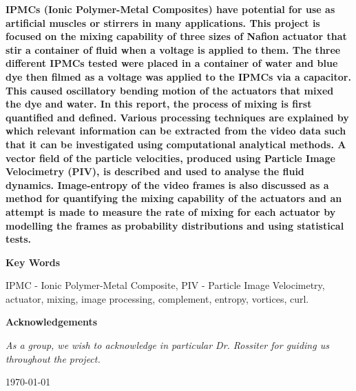 \begin{titlepage}
\begin{minipage}{0.9\textwidth}
\textbf{IPMCs (Ionic Polymer-Metal Composites) have potential for use as artificial muscles or stirrers in many applications. This project is focused on the mixing capability of three sizes of Nafion actuator that stir a container of fluid when a voltage is applied to them. The three different IPMCs tested were placed in a container of water and blue dye then filmed as a voltage was applied to the IPMCs via a capacitor. This caused oscillatory bending motion of the actuators that mixed the dye and water. In this report, the process of mixing is first quantified and defined. Various processing techniques are explained by which relevant information can be extracted from the video data such that it can be investigated using computational analytical methods. A vector field of the particle velocities, produced using Particle Image Velocimetry (PIV), is described and used to analyse the fluid dynamics. Image-entropy of the video frames is also discussed as a method for quantifying the mixing capability of the actuators and an attempt is made to measure the rate of mixing for each actuator by modelling the frames as probability distributions and using statistical tests.}


\vspace{1cm}

\textbf{Key Words}


IPMC - Ionic Polymer-Metal Composite, PIV - Particle Image Velocimetry,  actuator, mixing, image processing, complement, entropy, vortices, curl.

\vspace{0.5cm}


\textbf{Acknowledgements}

\textit{As a group, we wish to acknowledge in particular Dr. Rossiter for guiding us throughout the project.}

\end{minipage}



\vfill

\begin{center}
{\large \today}

\end{center}
\end{titlepage}